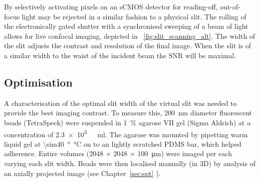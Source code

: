 By selectively activating pixels on an \gls{sCMOS} detector for reading-off, out-of-focus light may be rejected in a similar fashion to a physical slit.
The rolling of the electronically gated shutter with a synchronised sweeping of a beam of light allows for live confocal imaging, depicted in \figurename~\ref{fig:slit_scanning_alt}.
The width of the slit adjusts the contrast and resolution of the final image.
When the slit is of a similar width to the waist of the incident beam the \gls{SNR} will be maximal.


\subsection{Optimisation}

A characterisation of the optimal slit width of the virtual slit was needed to provide the best imaging contrast.
To measure this, \SI{200}{\nano\metre} diameter fluorescent beads (TetraSpeck) were suspended in \SI{1}{\percent} \gls{agarose VII} gel (Sigma Aldrich) at a concentration of \SI{2.3e3}{ \per\milli\litre}.
The agarose was mounted by pipetting warm liquid gel at \SI{\sim40}{\degree\celsius} on to an lightly scratched PDMS bar, which helped adherence.
Entire volumes (\SI{2048}{} \(\times\) \SI{2048}{} \(\times\) \SI{100}{\micro\metre}) were imaged per each varying each slit width.
Beads were then localised manually (in 3D) by analysis of an axially projected image (see Chapter~\ref{sec:spt} %
).

